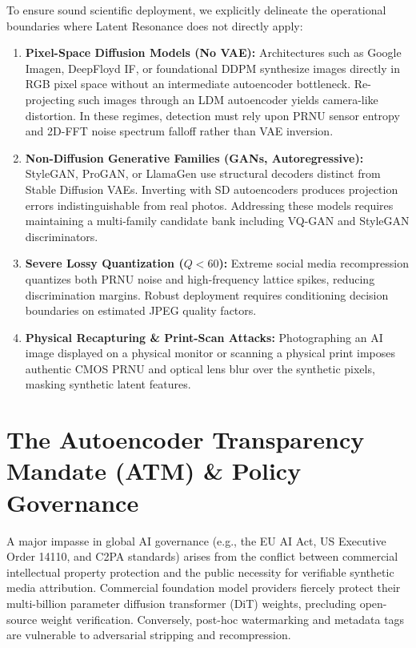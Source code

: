 \documentclass[11pt]{article}
\theoremstyle{definition}
\begin{document}
To ensure sound scientific deployment, we explicitly delineate the operational boundaries where Latent Resonance does not directly apply:
\begin{enumerate}
    \item \textbf{Pixel-Space Diffusion Models (No VAE):} Architectures such as Google Imagen, DeepFloyd IF, or foundational DDPM synthesize images directly in RGB pixel space without an intermediate autoencoder bottleneck. Re-projecting such images through an LDM autoencoder yields camera-like distortion. In these regimes, detection must rely upon PRNU sensor entropy and 2D-FFT noise spectrum falloff rather than VAE inversion.
    \item \textbf{Non-Diffusion Generative Families (GANs, Autoregressive):} StyleGAN, ProGAN, or LlamaGen use structural decoders distinct from Stable Diffusion VAEs. Inverting with SD autoencoders produces projection errors indistinguishable from real photos. Addressing these models requires maintaining a multi-family candidate bank including VQ-GAN and StyleGAN discriminators.
    \item \textbf{Severe Lossy Quantization ($Q < 60$):} Extreme social media recompression quantizes both PRNU noise and high-frequency lattice spikes, reducing discrimination margins. Robust deployment requires conditioning decision boundaries on estimated JPEG quality factors.
    \item \textbf{Physical Recapturing \& Print-Scan Attacks:} Photographing an AI image displayed on a physical monitor or scanning a physical print imposes authentic CMOS PRNU and optical lens blur over the synthetic pixels, masking synthetic latent features.
\end{enumerate}

\section{The Autoencoder Transparency Mandate (ATM) \& Policy Governance}
\label{sec:atm}

A major impasse in global AI governance (e.g., the EU AI Act, US Executive Order 14110, and C2PA standards) arises from the conflict between commercial intellectual property protection and the public necessity for verifiable synthetic media attribution. Commercial foundation model providers fiercely protect their multi-billion parameter diffusion transformer (DiT) weights, precluding open-source weight verification. Conversely, post-hoc watermarking and metadata tags are vulnerable to adversarial stripping and recompression.
\end{document}
